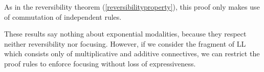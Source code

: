 As in the reversibility theorem (\cref{reversibilityproperty}), this proof only makes use of commutation of independent rules.

These results say nothing about exponential modalities, because they
respect neither reversibility nor focusing. However, if we consider
the fragment of LL which consists only of multiplicative and additive
connectives, we can restrict the proof rules to enforce focusing
without loss of expressiveness.


